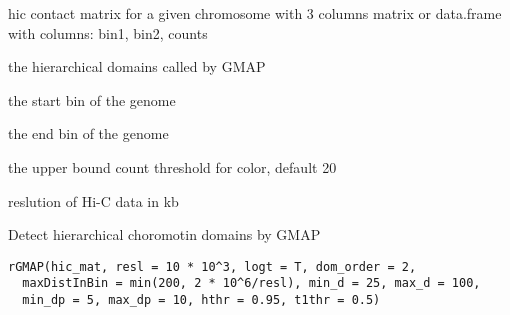 \documentclass[a4paper]{book}
\begin{document}
\begin{Arguments}
\begin{ldescription}
\item[\code{hic\_dat}] hic contact matrix for a given chromosome with 3 columns
matrix or data.frame with columns: bin1, bin2, counts

\item[\code{hiertads\_gmap}] the hierarchical domains called by GMAP

\item[\code{start\_bin}] the start bin of the genome

\item[\code{end\_bin}] the end bin of the genome

\item[\code{cthr}] the upper bound count threshold for color, default 20

\item[\code{kb\_resl}] reslution of Hi-C data in kb
\end{ldescription}
\end{Arguments}
%
\begin{Description}\relax
Detect hierarchical choromotin domains by GMAP
\end{Description}
%
\begin{Usage}
\begin{verbatim}
rGMAP(hic_mat, resl = 10 * 10^3, logt = T, dom_order = 2,
  maxDistInBin = min(200, 2 * 10^6/resl), min_d = 25, max_d = 100,
  min_dp = 5, max_dp = 10, hthr = 0.95, t1thr = 0.5)
\end{verbatim}
\end{Usage}
%
\end{document}
